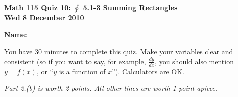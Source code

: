 \documentclass[11pt,letterpaper]{article}
\begin{document}
\flushleft
\begin{multicols}{2}


\begin{large}\textbf{Math 115 Quiz 10: $\oint $ 5.1-3 Summing Rectangles \\
Wed 8 December 2010}\end{large}

\textbf{Name:  }\underline{\hspace{35ex}}

\vspace{.5in}

\end{multicols}

\pagestyle{empty}

\flushleft

You have 30 minutes to complete this quiz.  Make your variables clear and
consistent (so if you want to say, for example, $\frac{dy}{dx}$, you should also
mention $y=f(x)$, or ``$y$ is a function of $x$'').  Calculators are OK.  

\emph{Part 2.(b) is worth 2 points.  All other lines are worth 1 point apiece.}
\end{document}
